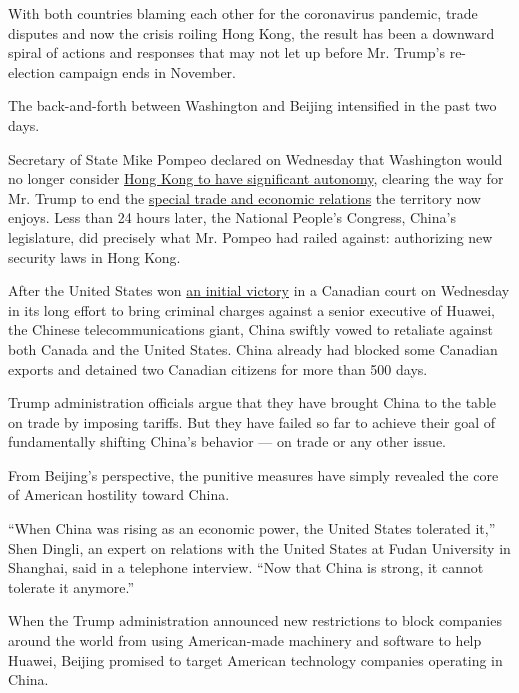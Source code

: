 With both countries blaming each other for the coronavirus pandemic,
trade disputes and now the crisis roiling Hong Kong, the result has been
a downward spiral of actions and responses that may not let up before
Mr. Trump's re-election campaign ends in November.

The back-and-forth between Washington and Beijing intensified in the
past two days.

Secretary of State Mike Pompeo declared on Wednesday that Washington
would no longer consider
\href{https://www.nytimes3xbfgragh.onion/2019/11/14/business/hong-kong-protests-recession.html}{Hong
Kong to have significant autonomy}, clearing the way for Mr. Trump to
end the
\href{https://www.nytimes3xbfgragh.onion/2020/05/22/world/asia/trump-pompeo-china-hong-kong.html}{special
trade and economic relations} the territory now enjoys. Less than 24
hours later, the National People's Congress, China's legislature, did
precisely what Mr. Pompeo had railed against: authorizing new security
laws in Hong Kong.

After the United States won
\href{https://www.nytimes3xbfgragh.onion/2020/05/27/world/canada/huawei-extradition-meng-wanzhou.html}{an
initial victory} in a Canadian court on Wednesday in its long effort to
bring criminal charges against a senior executive of Huawei, the Chinese
telecommunications giant, China swiftly vowed to retaliate against both
Canada and the United States. China already had blocked some Canadian
exports and detained two Canadian citizens for more than 500 days.

Trump administration officials argue that they have brought China to the
table on trade by imposing tariffs. But they have failed so far to
achieve their goal of fundamentally shifting China's behavior --- on
trade or any other issue.

From Beijing's perspective, the punitive measures have simply revealed
the core of American hostility toward China.

``When China was rising as an economic power, the United States
tolerated it,'' Shen Dingli, an expert on relations with the United
States at Fudan University in Shanghai, said in a telephone interview.
``Now that China is strong, it cannot tolerate it anymore.''

When the Trump administration announced new restrictions to block
companies around the world from using American-made machinery and
software to help Huawei, Beijing promised to target American technology
companies operating in China.

